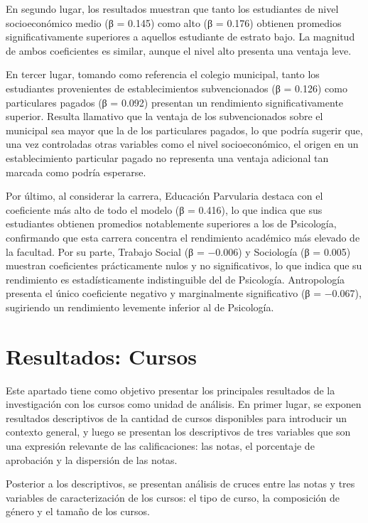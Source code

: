 \documentclass[
  spanish,
  a4paper,
  oneside]{scrbook}
\begin{document}
En segundo lugar, los resultados muestran que tanto los estudiantes de
nivel socioeconómico medio (β = 0.145) como alto (β = 0.176) obtienen
promedios significativamente superiores a aquellos estudiante de estrato
bajo. La magnitud de ambos coeficientes es similar, aunque el nivel alto
presenta una ventaja leve.

En tercer lugar, tomando como referencia el colegio municipal, tanto los
estudiantes provenientes de establecimientos subvencionados (β = 0.126)
como particulares pagados (β = 0.092) presentan un rendimiento
significativamente superior. Resulta llamativo que la ventaja de los
subvencionados sobre el municipal sea mayor que la de los particulares
pagados, lo que podría sugerir que, una vez controladas otras variables
como el nivel socioeconómico, el origen en un establecimiento particular
pagado no representa una ventaja adicional tan marcada como podría
esperarse.

Por último, al considerar la carrera, Educación Parvularia destaca con
el coeficiente más alto de todo el modelo (β = 0.416), lo que indica que
sus estudiantes obtienen promedios notablemente superiores a los de
Psicología, confirmando que esta carrera concentra el rendimiento
académico más elevado de la facultad. Por su parte, Trabajo Social (β =
−0.006) y Sociología (β = 0.005) muestran coeficientes prácticamente
nulos y no significativos, lo que indica que su rendimiento es
estadísticamente indistinguible del de Psicología. Antropología presenta
el único coeficiente negativo y marginalmente significativo (β =
−0.067), sugiriendo un rendimiento levemente inferior al de Psicología.


\chapter{Resultados: Cursos}\label{resultados-cursos}

Este apartado tiene como objetivo presentar los principales resultados
de la investigación con los cursos como unidad de análisis. En primer
lugar, se exponen resultados descriptivos de la cantidad de cursos
disponibles para introducir un contexto general, y luego se presentan
los descriptivos de tres variables que son una expresión relevante de
las calificaciones: las notas, el porcentaje de aprobación y la
dispersión de las notas.

Posterior a los descriptivos, se presentan análisis de cruces entre las
notas y tres variables de caracterización de los cursos: el tipo de
curso, la composición de género y el tamaño de los cursos.
\end{document}
